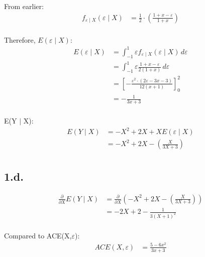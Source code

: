 \documentclass{article}
\begin{document}
From earlier:
\begin{align*}
    f_{\varepsilon \mid X}(\varepsilon \mid X)
    &= \frac{1}{2} \cdot \left(\frac{1+x-\varepsilon}{1+x}\right)\\
\end{align*}

Therefore, $E(\varepsilon \mid X)$:
\begin{align*}
    E(\varepsilon \mid X)
    &= \int_{-1}^{1}\varepsilon f_{\varepsilon \mid X}(\varepsilon \mid X) \,d\varepsilon \\
    &= \int_{-1}^{1}\varepsilon \frac{1+x-\varepsilon}{2(1+x)} \,d\varepsilon \\
    &= \left[ -\frac{\varepsilon^2\cdot\left(2\varepsilon-3x-3\right)}{12\left(x+1\right)}\right]_{0}^{2}\\
    &= -\frac{1}{3x+3}\\
\end{align*}

E(Y $\mid$ X):
\begin{align*}
    E(Y \mid X)
    &= -X^2 + 2X + XE(\varepsilon \mid X)\\
    &= -X^2 + 2X - \left(\frac{X}{3X+3}\right)\\
\end{align*}

\subsection*{1.d.}
\begin{align*}
    \frac{\partial}{\partial X}E(Y \mid X)
    &= \frac{\partial}{\partial X}\left(-X^2 + 2X - \left(\frac{X}{3X+3}\right)\right)\\
    &= -2X + 2 - \frac{1}{3(X+1)^2}\\
\end{align*}

Compared to ACE(X,$\varepsilon$):
\begin{align*}
    ACE(X, \varepsilon)
    &= \frac{5-6x^2}{3x+3}
\end{align*}

\begin{figure}[!h]
\centering
{}
\end{figure}
\end{document}
